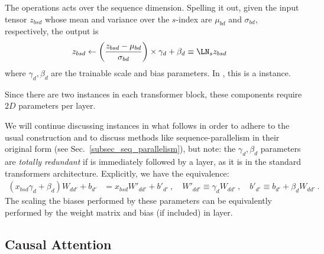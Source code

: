 \documentclass[11pt]{article}
\begin{document}
The  operations acts over the sequence dimension. Spelling it out, given the
input tensor $ z _{ bsd } $ whose mean and variance over the $ s $-index are $ \mu _{ bd } $ and $
\sigma _{ bd } $, respectively, the  output is
\begin{align}
  z _{ bsd } &\leftarrow \left ( \frac{ z _{ bsd } - \mu _{ bd } }{ \sigma _{ bd } } \right )\times \gamma _{ d }
  + \beta _{ d } \equiv \LN _{ s } z _{ bsd}
\end{align}
where $ \gamma _{ d }, \beta  _{ d } $ are the trainable scale and bias parameters. In
, this is a  instance.

Since there are two  instances in each transformer block, these components require
$ 2D $ parameters per layer.

We will continue discussing  instances in what follows in order to adhere to the
usual construction and to discuss methods like sequence-parallelism in their original form (see
Sec.~\ref{subsec_seq_parallelism}), but note: the  $ \gamma _{ d }, \beta _{ d } $ parameters are
\textit{totally redundant} if  is immediately followed by a 
layer, as it is in the standard transformers architecture. Explicitly, we have the equivalence:
\begin{align}
 \left (     x _{ bsd } \gamma _{ d } + \beta _{ d } \right )  W _{d d'}    + b _{ d' }&= x _{ bsd }
 W' _{ d d' } + b' _{ d' } \ , \quad W' _{ d d' } \equiv  \gamma _{  d} W _{ d d' } \ , \quad b' _{
 d' } \equiv b _{ d' } + \beta _{ d }W _{ d d' } \ .
\end{align}
The scaling the biases performed by these
parameters can be equivalently performed by the weight matrix and bias (if included) in
 layer.

\subsection{Causal Attention \label{subsubsec_attn_layer} }
\end{document}
